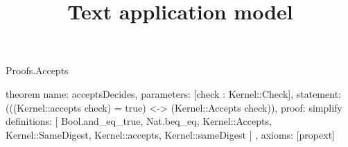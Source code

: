 \begin{lexlean}{Proofs.Accepts}
\title{Text application model}
\begin{semanticmodule}
theorem{
  name: acceptsDecides,
  parameters: [check : Kernel::Check],
  statement: (((Kernel::accepts check) = true) <-> (Kernel::Accepts check)),
  proof: simplify{
    definitions: [
      Bool.and_eq_true,
      Nat.beq_eq,
      Kernel::Accepts,
      Kernel::SameDigest,
      Kernel::accepts,
      Kernel::sameDigest
    ]
  },
  axioms: [propext]
}
\end{semanticmodule}
\end{lexlean}
